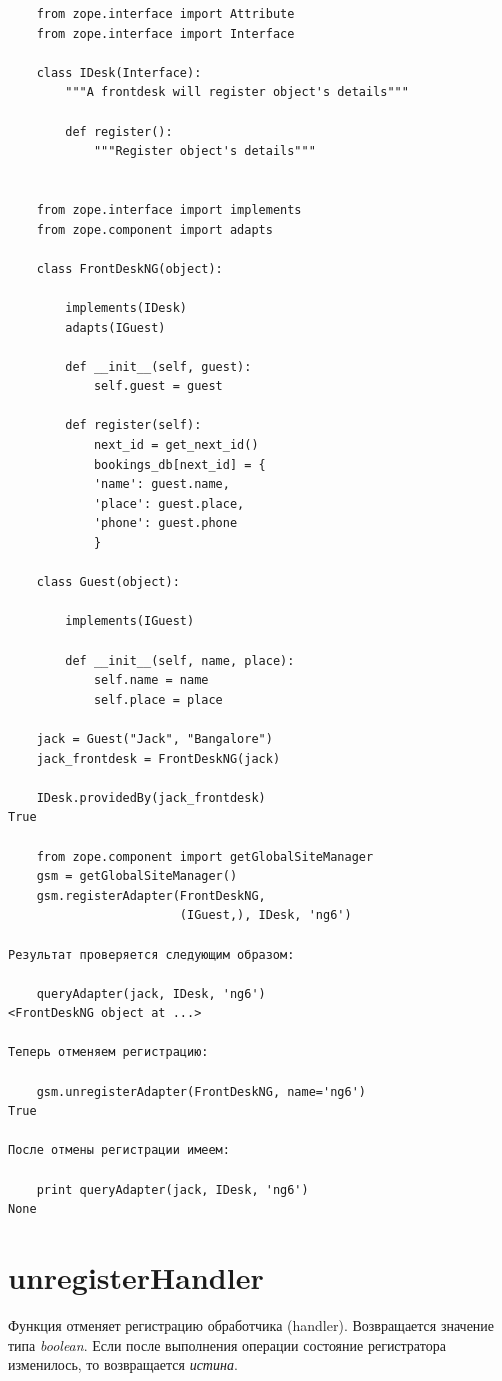 \documentclass[a4paper,openany,twoside,final]{book}
\providecommand*{\DUroletitlereference}[1]{\textsl{#1}}
\begin{document}
\begin{verbatim}
    from zope.interface import Attribute
    from zope.interface import Interface

    class IDesk(Interface):
        """A frontdesk will register object's details"""

        def register():
            """Register object's details"""


    from zope.interface import implements
    from zope.component import adapts

    class FrontDeskNG(object):

        implements(IDesk)
        adapts(IGuest)

        def __init__(self, guest):
            self.guest = guest

        def register(self):
            next_id = get_next_id()
            bookings_db[next_id] = {
            'name': guest.name,
            'place': guest.place,
            'phone': guest.phone
            }

    class Guest(object):

        implements(IGuest)

        def __init__(self, name, place):
            self.name = name
            self.place = place

    jack = Guest("Jack", "Bangalore")
    jack_frontdesk = FrontDeskNG(jack)

    IDesk.providedBy(jack_frontdesk)
True

    from zope.component import getGlobalSiteManager
    gsm = getGlobalSiteManager()
    gsm.registerAdapter(FrontDeskNG,
                        (IGuest,), IDesk, 'ng6')

Результат проверяется следующим образом:

    queryAdapter(jack, IDesk, 'ng6')
<FrontDeskNG object at ...>

Теперь отменяем регистрацию:

    gsm.unregisterAdapter(FrontDeskNG, name='ng6')
True

После отмены регистрации имеем:

    print queryAdapter(jack, IDesk, 'ng6')
None
\end{verbatim}


\section*{unregisterHandler%
  \label{unregisterhandler}%
}

Функция отменяет регистрацию обработчика (handler). Возвращается значение типа \DUroletitlereference{boolean}.  Если после выполнения операции состояние регистратора изменилось, то возвращается \DUroletitlereference{истина}.
\end{document}
